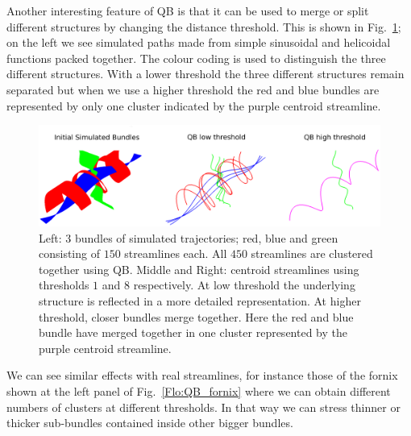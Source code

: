 \documentclass{bioinfo}
\begin{document}
\begin{methods}
Another interesting feature of QB is that it can be used to merge or
split different structures by changing the distance threshold.  This is
shown in Fig.~\ref{Flo:simulated_orbits}; on the left we see simulated
paths made from simple sinusoidal and helicoidal functions packed
together. The colour coding is used to distinguish the three different
structures. With a lower threshold the three different structures remain
separated but when we use a higher threshold the red and blue bundles
are represented by only one cluster indicated by the purple centroid
streamline.

\begin{figure}
\begin{centering}
\includegraphics[width=160mm]{Figures/Fig_5_helix_phantom}
\par\end{centering}
\caption{Left: $3$ bundles of simulated trajectories; red, blue and
  green consisting of $150$ streamlines each. All $450$ streamlines are
  clustered together using QB. Middle and Right: centroid streamlines
  using thresholds $1$ and $8$ respectively.  At low threshold the
  underlying structure is reflected in a more detailed
  representation. At higher threshold, closer bundles merge
  together. Here the red and blue bundle have merged together in one
  cluster represented by the purple centroid
  streamline.\label{Flo:simulated_orbits}}
\end{figure}

We can see similar effects with real streamlines, for instance those of
the fornix shown at the left panel of Fig.~\ref{Flo:QB_fornix} where we
can obtain different numbers of clusters at different thresholds. In
that way we can stress thinner or thicker sub-bundles contained inside
other bigger bundles.


\end{methods}
\end{document}
